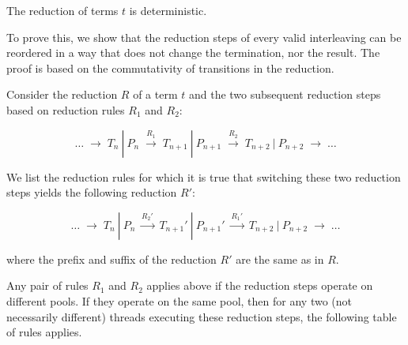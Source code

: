 \documentclass[runningheads,a4paper]{llncs}
\begin{document}
\begin{theorem}[Determinism]
The reduction of terms $t$ is deterministic.
\end{theorem}

To prove this, we show that the reduction steps of every valid
interleaving can be reordered in a way that does not change the
termination, nor the result.
The proof is based on the commutativity of transitions in the
reduction.

\begin{lemma}[Commutativity]\label{lemma-commutativity}
Consider the reduction $R$ of a term $t$ and the two subsequent reduction
steps based on reduction rules $R_1$ and $R_2$:

\begin{equation*}
\ldots \;\longrightarrow\; T_n~|~P_n \;\stackrel{R_1}{\longrightarrow}\; T_{n+1}~|~P_{n+1}
\;\stackrel{R_2}{\longrightarrow}\; T_{n+2}~|~P_{n+2}
\;\longrightarrow\; \ldots
\end{equation*}

We list the reduction rules for which it is true that switching these
two reduction steps yields the following reduction $R'$:

\begin{equation*}
\ldots \;\longrightarrow\; T_n~|~P_n \;\stackrel{R_2'}{\longrightarrow}\; T_{n+1}'~|~P_{n+1}'
\;\stackrel{R_1'}{\longrightarrow}\; T_{n+2}~|~P_{n+2}
\;\longrightarrow\; \ldots
\end{equation*}

where the prefix and suffix of the reduction $R'$ are the same as in $R$.

Any pair of rules $R_1$ and $R_2$ applies above if the reduction steps
operate on different pools.
If they operate on the same pool, then for any two (not necessarily
different) threads executing these reduction steps, the following
table of rules applies.


\end{lemma}
\end{document}
